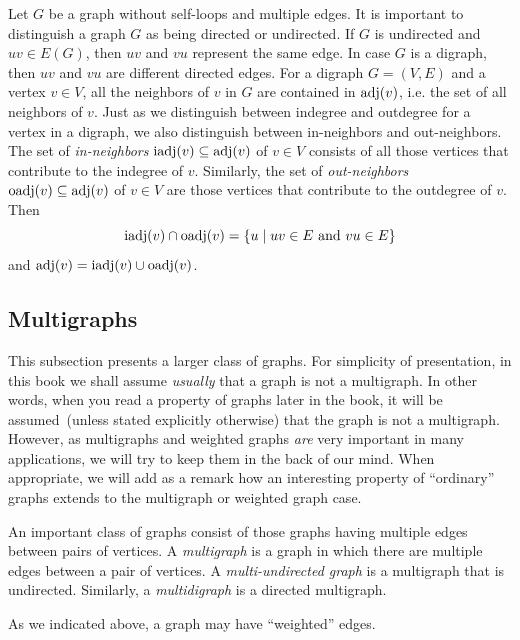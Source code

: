 Let $G$ be a graph without self-loops and multiple edges. It is
important to distinguish a graph $G$ as being directed or undirected.
If $G$ is undirected and $uv \in E(G)$, then $uv$ and $vu$
represent the same edge. In case $G$ is a digraph, then $uv$ and $vu$
are different directed edges. For a digraph $G = (V, E)$ and a vertex
$v \in V$, all the neighbors of $v$ in $G$ are contained in $\operatorname*{adj}(v)$,
i.e. the set of all neighbors of $v$. Just as we distinguish between
indegree and outdegree for a vertex in a digraph, we also distinguish
between in-neighbors and out-neighbors. The set of
\emph{in-neighbors}
$\operatorname*{iadj}(v) \subseteq \operatorname*{adj}(v)$\index{$\iadj$} of $v \in V$ consists of
all those vertices that contribute to the indegree of $v$. Similarly,
the set of \emph{out-neighbors}
$\operatorname*{oadj}(v) \subseteq \operatorname*{adj}(v)$\index{$\oadj$} of $v \in V$ are those
vertices that contribute to the outdegree of $v$. Then
\[
\operatorname*{iadj}(v) \cap \operatorname*{oadj}(v)
=
\{u \mid uv \in E \text{ and } vu \in E\}
\]
and $\operatorname*{adj}(v) = \operatorname*{iadj}(v) \cup \operatorname*{oadj}(v)$.



\subsection{Multigraphs}

This subsection presents a larger class of graphs. For simplicity of
presentation, in this book we shall assume \emph{usually} that a graph
is not a multigraph. In other words, when you read a property of
graphs later in the book, it will be assumed~(unless stated explicitly
otherwise) that the graph is not a multigraph. However, as multigraphs
and weighted graphs \emph{are} very important in many applications, we
will try to keep them in the back of our mind. When appropriate, we
will add as a remark how an interesting property of ``ordinary''
graphs extends to the multigraph or weighted graph case.

An important class of graphs consist of those graphs having multiple
edges between pairs of vertices. A \emph{multigraph}
is a graph in which there are multiple edges between a pair of
vertices. A \emph{multi-undirected graph}
is a multigraph that is undirected. Similarly, a
\emph{multidigraph} is a directed multigraph.

As we indicated above, a graph may have ``weighted''
edges.

